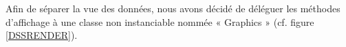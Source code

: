 
Afin de séparer la vue des données, nous avons décidé de déléguer les méthodes d'affichage à une classe non instanciable nommée « Graphics » (cf. figure \ref{DSSRENDER}).


